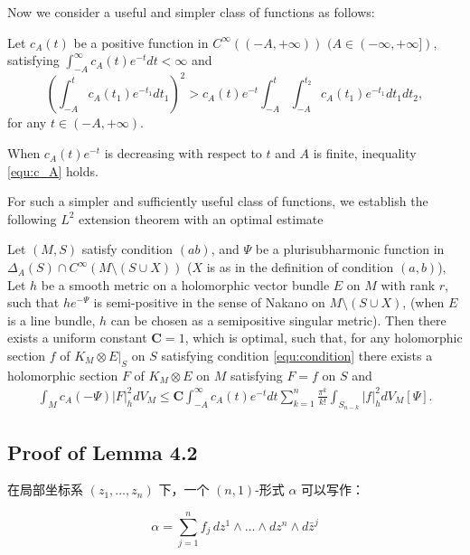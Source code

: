 Now we consider a useful and simpler class of functions as follows:

Let $c_{A}(t)$ be a positive function in $C^{\infty}((-A,+\infty))$
$(A\in(-\infty,+\infty])$, satisfying
$\int_{-A}^{\infty}c_{A}(t)e^{-t}dt<\infty$ and
\begin{equation}
\label{equ:c_A}
\left(\int_{-A}^{t}c_{A}(t_{1})e^{-t_{1}}dt_{1}\right)^{2}>c_{A}(t)e^{-t}
\int_{-A}^{t}\int_{-A}^{t_{2}}c_{A}(t_{1})e^{-t_{1}}dt_{1}dt_{2},
\end{equation}
for any $t\in(-A,+\infty)$.

When $c_{A}(t)e^{-t}$ is decreasing with respect to $t$ and $A$ is finite, inequality \ref{equ:c_A} holds.

For such a simpler and sufficiently useful class of functions, we
establish the following $L^2$ extension theorem with an optimal
estimate
\begin{theorem}
  Let $(M,S)$ satisfy condition $(ab)$, and $\Psi$ be a
plurisubharmonic function in $\Delta_{A}(S)\cap
C^{\infty}(M\setminus (S\cup X))$ ($X$ is as in the definition of
condition $(a,b)$), Let $h$ be a smooth metric on a holomorphic
vector bundle $E$ on $M$ with rank $r$, such that $he^{-\Psi}$ is
semi-positive in the sense of Nakano on $M\setminus (S\cup X)$,
(when $E$ is a line bundle, $h$ can be chosen as a semipositive
singular metric). Then there exists a uniform constant
$\mathbf{C}=1$, which is optimal, such that, for any holomorphic
section $f$ of $K_{M}\otimes E|_{S}$ on $S$ satisfying condition
\ref{equ:condition}  there exists a holomorphic section $F$ of
$K_{M}\otimes E$ on $M$ satisfying $F = f$ on $ S$ and
\begin{eqnarray*}
\int_{M}c_{A}(-\Psi)|F|^{2}_{h}dV_{M}
\leq\mathbf{C}\int_{-A}^{\infty}c_{A}(t)e^{-t}dt\sum_{k=1}^{n}\frac{\pi^{k}}{k!}\int_{S_{n-k}}|f|^{2}_{h}dV_{M}[\Psi].
\end{eqnarray*}
\end{theorem}
  

\subsection{Proof of Lemma 4.2}

在局部坐标系 \((z_1, \ldots, z_n)\) 下，一个 \((n, 1)\)-形式 \(\alpha\) 可以写作：

\[
\alpha = \sum_{j=1}^{n} f_j \, dz^1 \wedge \ldots \wedge dz^n \wedge d\bar{z}^j
\]

